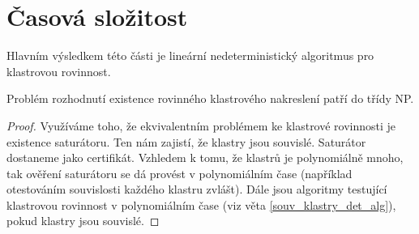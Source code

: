 \section{Časová složitost}
Hlavním výsledkem této části je lineární nedeterministický algoritmus pro klastrovou rovinnost.
\begin{tvr}
Problém rozhodnutí existence rovinného klastrového nakreslení patří do třídy NP.
\end{tvr}
\begin{proof}
Využíváme toho, že ekvivalentním problémem ke klastrové rovinnosti je existence saturátoru. Ten nám zajistí, že klastry jsou souvislé. Saturátor dostaneme jako certifikát. Vzhledem k tomu, že klastrů je polynomiálně mnoho, tak ověření saturátoru se dá provést  v polynomiálním čase (například otestováním souvislosti každého klastru zvlášt). Dále jsou algoritmy testující klastrovou rovinnost v polynomiálním čase (viz věta \ref{souv_klastry_det_alg}), pokud klastry jsou souvislé. 
\end{proof}

